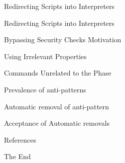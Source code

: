 \documentclass[aspectratio=169,xcolor=dvipsnames]{beamer}
\begin{document}
\begin{frame}{Redirecting Scripts into Interpreters}
    
\end{frame}

\begin{frame}{Redirecting Scripts into Interpreters}
    
\end{frame}

\begin{frame}{Bypassing Security Checks Motivation}
    
\end{frame}

\begin{frame}{Using Irrelevant Properties}
    
\end{frame}

\begin{frame}{Commands Unrelated to the Phase}
    
\end{frame}

\begin{frame}{Prevalence of anti-patterns}
    
\end{frame}

\begin{frame}{Automatic removal of anti-pattern}
    
\end{frame}

\begin{frame}{Acceptance of Automatic removals}
    
\end{frame}

\begin{frame}[allowframebreaks]{References}
\def\newblock{}



\end{frame}

\begin{frame}
    \Huge{\centerline{The End}}
\end{frame}

\end{document}
